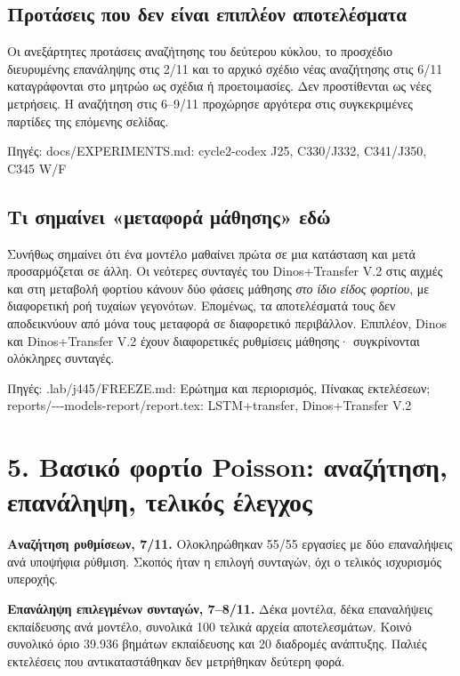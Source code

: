 \documentclass[10pt,a4paper]{article}
\newcommand{\src}[1]{\par{\scriptsize\color{gray}Πηγές: {\ttfamily #1}}\par}
\newcommand{\page}[1]{\clearpage\section*{#1}}
\begin{document}
\subsection*{Προτάσεις που δεν είναι επιπλέον αποτελέσματα}
Οι ανεξάρτητες προτάσεις αναζήτησης του δεύτερου κύκλου, το προσχέδιο διευρυμένης επανάληψης στις 2/11 και το αρχικό σχέδιο νέας αναζήτησης στις 6/11 καταγράφονται στο μητρώο ως σχέδια ή προετοιμασίες. Δεν προστίθενται ως νέες μετρήσεις. Η αναζήτηση στις 6--9/11 προχώρησε αργότερα στις συγκεκριμένες παρτίδες της επόμενης σελίδας.
\src{docs/\allowbreak EXPERIMENTS.md: cycle2-\allowbreak codex J25, C330/\allowbreak J332, C341/\allowbreak J350, C345 W/\allowbreak F}
\subsection*{Τι σημαίνει «μεταφορά μάθησης» εδώ}
Συνήθως σημαίνει ότι ένα μοντέλο μαθαίνει πρώτα σε μια κατάσταση και μετά προσαρμόζεται σε άλλη. Οι νεότερες συνταγές του Dinos+Transfer V.2 στις αιχμές και στη μεταβολή φορτίου κάνουν δύο φάσεις μάθησης \emph{στο ίδιο είδος φορτίου}, με διαφορετική ροή τυχαίων γεγονότων. Επομένως, τα αποτελέσματά τους δεν αποδεικνύουν από μόνα τους μεταφορά σε διαφορετικό περιβάλλον. Επιπλέον, Dinos και Dinos+Transfer V.2 έχουν διαφορετικές ρυθμίσεις μάθησης· συγκρίνονται ολόκληρες συνταγές.
\src{.lab/\allowbreak j445/\allowbreak FREEZE.md: Ερώτημα και περιορισμός, Πίνακας εκτελέσεων; reports/\allowbreak 2026-\allowbreak 11-\allowbreak 10-\allowbreak models-\allowbreak report/\allowbreak report.tex: LSTM+transfer, Dinos+Transfer V.2}
\page{5. Βασικό φορτίο Poisson: αναζήτηση, επανάληψη, τελικός έλεγχος}
\textbf{Αναζήτηση ρυθμίσεων, 7/11.} Ολοκληρώθηκαν 55/55 εργασίες με δύο επαναλήψεις ανά υποψήφια ρύθμιση. Σκοπός ήταν η επιλογή συνταγών, όχι ο τελικός ισχυρισμός υπεροχής.

\textbf{Επανάληψη επιλεγμένων συνταγών, 7--8/11.} Δέκα μοντέλα, δέκα επαναλήψεις εκπαίδευσης ανά μοντέλο, συνολικά 100 τελικά αρχεία αποτελεσμάτων. Κοινό συνολικό όριο 39.936 βημάτων εκπαίδευσης και 20 διαδρομές ανάπτυξης. Παλιές εκτελέσεις που αντικαταστάθηκαν δεν μετρήθηκαν δεύτερη φορά.
\end{document}
